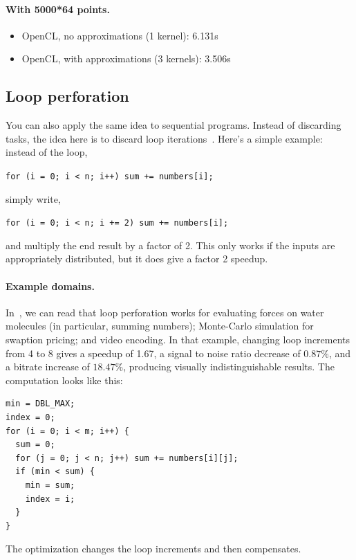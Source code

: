 \documentclass[a4paper]{report}
\begin{document}
 \paragraph{With 5000*64 points.}
\begin{itemize}
\item    OpenCL, no approximations (1 kernel): 6.131s
\item    OpenCL, with approximations (3 kernels): 3.506s
\end{itemize}


\subsection*{Loop perforation} 
You can also apply the same idea to sequential programs. Instead
of discarding tasks, the idea here is to discard loop iterations~\cite{hoffmann09:_using_code_perfor_improv_perfor}.
Here's a simple example: instead of the loop,
\begin{center}
\verb|for (i = 0; i < n; i++) sum += numbers[i];|
\end{center} \vspace*{-1em}
simply write,
\vspace*{-1em}\begin{center}
\verb|for (i = 0; i < n; i += 2) sum += numbers[i];|
\end{center}
and multiply the end result by a factor of 2. This only works 
if the inputs are appropriately distributed, but it does give a
factor 2 speedup.

\paragraph{Example domains.} In~\cite{Rinard:2010:PSA:1932682.1869525},
we can read that loop perforation works for evaluating forces on water
molecules (in particular, summing numbers); Monte-Carlo simulation for
swaption pricing; and video encoding. In that example, changing loop
increments from 4 to 8 gives a speedup of 1.67, a signal to noise ratio
decrease of $0.87\%$, and a bitrate increase of $18.47\%$, producing
visually indistinguishable results. The computation looks like this:

{\small
\begin{verbatim}
min = DBL_MAX;
index = 0;
for (i = 0; i < m; i++) {
  sum = 0;
  for (j = 0; j < n; j++) sum += numbers[i][j];
  if (min < sum) {
    min = sum;
    index = i;
  }
}
\end{verbatim}
}
The optimization changes the loop increments and then compensates. 
\end{document}
